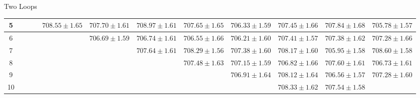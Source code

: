 \documentclass[hyphens,aspectratio=169]{beamer}
\begin{document}
\begin{frame}[fragile]{Two Loops}
\begin{table}[H]
\begin{adjustbox}{max width=\textwidth}
\begin{tabular}{|c|c|c|c|c|c|c|c|c|c|c|c|}
				\hline
				5                 &                   &                   &                   & $708.55 \pm 1.65$ & $707.70 \pm 1.61$ & $708.97 \pm
				1.61$             & $707.65 \pm 1.65$ & $706.33 \pm 1.59$ & $707.45 \pm
				1.66$             & $707.84 \pm 1.68$ & $705.78 \pm 1.57$                                                                                                                                                                                     \\
				\hline
				6                 &                   &                   &                   &                   & $706.69 \pm 1.59$ & $706.74 \pm 1.61$ & $706.55 \pm
				1.66$             & $706.21 \pm 1.60$ & $707.41 \pm 1.57$ & $707.38 \pm
				1.62$             & $707.28 \pm 1.66$                                                                                                                                                                                                         \\
				\hline
				7                 &                   &                   &                   &                   &                   & $707.64 \pm 1.61$ & $708.29 \pm 1.56$ & $707.38
				\pm 1.60$         & $708.17 \pm 1.60$ & $705.95 \pm 1.58$ & $708.60 \pm 1.58$                                                                                                                                                                 \\
				\hline
				8                 &                   &                   &                   &                   &                   &                   & $707.48 \pm 1.63$ & $707.15 \pm 1.59$ & $706.82
				\pm 1.66$         & $707.60 \pm 1.61$ & $706.73 \pm 1.61$                                                                                                                                                                                     \\
				\hline
				9                 &                   &                   &                   &                   &                   &                   &                   & $706.91 \pm 1.64$ & $708.12 \pm 1.64$ &
				$706.56 \pm 1.57$ & $707.28 \pm 1.60$                                                                                                                                                                                                         \\
				\hline
				10                &                   &                   &                   &                   &                   &                   &                   &                   & $708.33 \pm 1.62$ & $707.54 \pm 1.58$ &

\end{tabular}
\end{adjustbox}
\end{table}
\end{frame}
\end{document}
